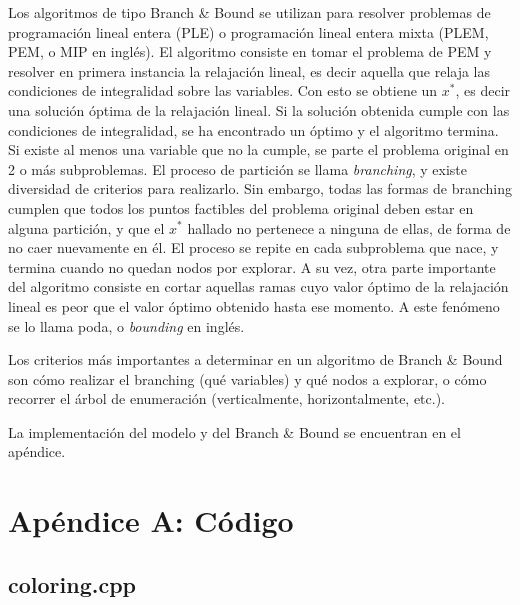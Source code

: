 \documentclass[10pt,a4paper]{article}
\begin{document}
Los algoritmos de tipo Branch \& Bound se utilizan para resolver problemas de programación lineal entera (PLE) o programación lineal entera mixta (PLEM, PEM, o MIP en inglés). El algoritmo consiste en tomar el problema de PEM y resolver en primera instancia la relajación lineal, es decir aquella que relaja las condiciones de integralidad sobre las variables. Con esto se obtiene un $x^*$, es decir una solución óptima de la relajación lineal. Si la solución obtenida cumple con las condiciones de integralidad, se ha encontrado un óptimo y el algoritmo termina. Si existe al menos una variable que no la cumple, se parte el problema original en 2 o más subproblemas. El proceso de partición se llama \textit{branching}, y existe diversidad de criterios para realizarlo. Sin embargo, todas las formas de branching cumplen que todos los puntos factibles del problema original deben estar en alguna partición, y que el $x^*$ hallado no pertenece a ninguna de ellas, de forma de no caer nuevamente en él. El proceso se repite en cada subproblema que nace, y termina cuando no quedan nodos por explorar. A su vez, otra parte importante del algoritmo consiste en cortar aquellas ramas cuyo valor óptimo de la relajación lineal es peor que el valor óptimo obtenido hasta ese momento. A este fenómeno se lo llama poda, o \textit{bounding} en inglés.

Los criterios más importantes a determinar en un algoritmo de Branch \& Bound son cómo realizar el branching (qué variables) y qué nodos a explorar, o cómo recorrer el árbol de enumeración (verticalmente, horizontalmente, etc.).

La implementación del modelo y del Branch \& Bound se encuentran en el apéndice.

\newpage

\newpage


\vfill



\pagebreak

\section{Apéndice A: Código}
\subsection{coloring.cpp}

\end{document}
